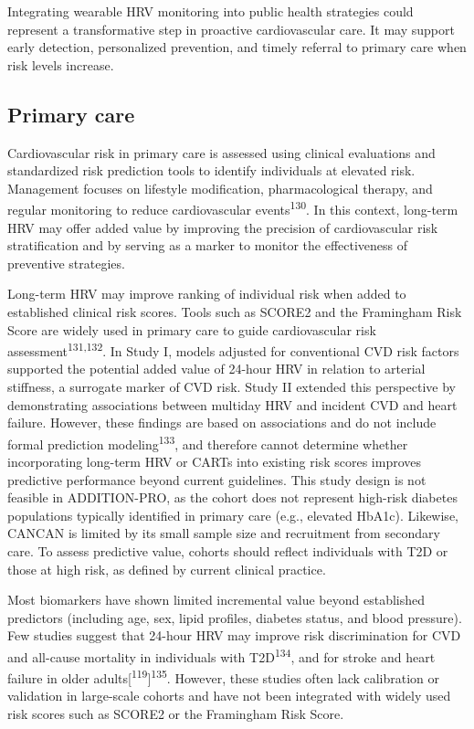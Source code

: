 \documentclass[
  letterpaper,
  headsepline=true,
  open=any]{scrbook}
\begin{document}
Integrating wearable HRV monitoring into public health strategies could
represent a transformative step in proactive cardiovascular care. It may
support early detection, personalized prevention, and timely referral to
primary care when risk levels increase.

\hypertarget{primary-care}{%
\subsection{Primary care}\label{primary-care}}

Cardiovascular risk in primary care is assessed using clinical
evaluations and standardized risk prediction tools to identify
individuals at elevated risk. Management focuses on lifestyle
modification, pharmacological therapy, and regular monitoring to reduce
cardiovascular events\textsuperscript{130}. In this context, long-term
HRV may offer added value by improving the precision of cardiovascular
risk stratification and by serving as a marker to monitor the
effectiveness of preventive strategies.

Long-term HRV may improve ranking of individual risk when added to
established clinical risk scores. Tools such as SCORE2 and the
Framingham Risk Score are widely used in primary care to guide
cardiovascular risk assessment\textsuperscript{131,132}. In Study I,
models adjusted for conventional CVD risk factors supported the
potential added value of 24-hour HRV in relation to arterial stiffness,
a surrogate marker of CVD risk. Study II extended this perspective by
demonstrating associations between multiday HRV and incident CVD and
heart failure. However, these findings are based on associations and do
not include formal prediction modeling\textsuperscript{133}, and
therefore cannot determine whether incorporating long-term HRV or CARTs
into existing risk scores improves predictive performance beyond current
guidelines. This study design is not feasible in ADDITION-PRO, as the
cohort does not represent high-risk diabetes populations typically
identified in primary care (e.g., elevated HbA1c). Likewise, CANCAN is
limited by its small sample size and recruitment from secondary care. To
assess predictive value, cohorts should reflect individuals with T2D or
those at high risk, as defined by current clinical practice.

Most biomarkers have shown limited incremental value beyond established
predictors (including age, sex, lipid profiles, diabetes status, and
blood pressure). Few studies suggest that 24-hour HRV may improve risk
discrimination for CVD and all-cause mortality in individuals with
T2D\textsuperscript{134}, and for stroke and heart failure in older
adults{[}\textsuperscript{119}{]}\textsuperscript{135}. However, these
studies often lack calibration or validation in large-scale cohorts and
have not been integrated with widely used risk scores such as SCORE2 or
the Framingham Risk Score.
\end{document}
